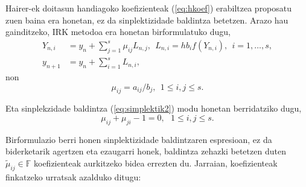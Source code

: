 Hairer-ek doitasun handiagoko koefizienteak (\ref{eq:hkoef}) erabiltzea proposatu zuen  baina era honetan, ez da sinplektizidade baldintza betetzen. Arazo hau gainditzeko, IRK metodoa era honetan birformulatuko dugu,
\begin{align}
\label{eq:irk}
Y_{n,i}&=y_n+ \sum\limits_{j=1}^{s} \mu_{ij} L_{n,j},  \ \ L_{n,i}=hb_if(Y_{n,i}), \ \ i=1,\dots,s,\\
y_{n+1}&=y_n+\sum\limits_{i=1}^{s} L_{n,i},
\end{align}
non 
\begin{equation*}
\mu_{ij}=a_{ij}/{b_j}, \ \ 1 \leqslant i,j \leqslant s.
\end{equation*}

Eta sinplekzidade baldintza (\ref{eq:simplektik2}) modu honetan berridatziko dugu,
\begin{equation}
\label{eq:sinplekmij}
\mu_{ij}+\mu_{ji}-1=0, \ \ \ 1 \leqslant i,j \leqslant s.
\end{equation}
 
Birformulazio berri honen sinplektizidade baldintzaren espresioan, ez da biderketarik agertzen eta ezaugarri honek, baldintza zehazki betetzen duten $\tilde \mu_{ij} \in \mathbb{F}$ koefizienteak aurkitzeko bidea errezten du. Jarraian, koefizienteak finkatzeko urratsak azalduko ditugu:

